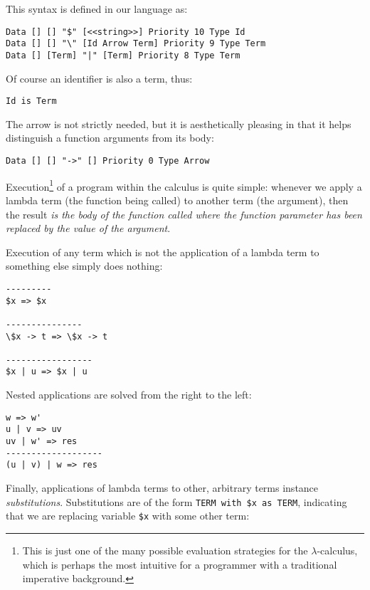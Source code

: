 This syntax is defined in our language as:

\begin{lstlisting}
Data [] [] "$" [<<string>>] Priority 10 Type Id
Data [] [] "\" [Id Arrow Term] Priority 9 Type Term
Data [] [Term] "|" [Term] Priority 8 Type Term
\end{lstlisting}

Of course an identifier is also a term, thus:

\begin{lstlisting}
Id is Term
\end{lstlisting}

The arrow is not strictly needed, but it is aesthetically pleasing in that it helps distinguish a function arguments from its body:

\begin{lstlisting}
Data [] [] "->" [] Priority 0 Type Arrow
\end{lstlisting}

Execution\footnote{This is just one of the many possible evaluation strategies for the $\lambda$-calculus, which is perhaps the most intuitive for a programmer with a traditional imperative background.} of a program within the calculus is quite simple: whenever we apply a lambda term (the function being called) to another term (the argument), then the result \textit{is the body of the function called where the function parameter has been replaced by the value of the argument}.

Execution of any term which is not the application of a lambda term to something else simply does nothing:

\begin{lstlisting}
---------
$x => $x

---------------
\$x -> t => \$x -> t

-----------------
$x | u => $x | u
\end{lstlisting}

Nested applications are solved from the right to the left:

\begin{lstlisting}
w => w'
u | v => uv
uv | w' => res
-------------------
(u | v) | w => res
\end{lstlisting}

Finally, applications of lambda terms to other, arbitrary terms instance \textit{substitutions}. Substitutions are of the form \texttt{TERM with \$x as TERM}, indicating that we are replacing variable \texttt{\$x} with some other term:

